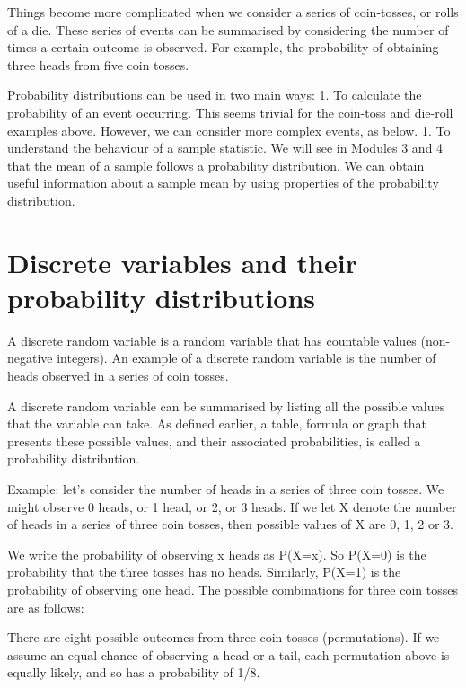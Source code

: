 \documentclass[
]{memoir}
\begin{document}
Things become more complicated when we consider a series of coin-tosses, or rolls of a die. These series of events can be summarised by considering the number of times a certain outcome is observed. For example, the probability of obtaining three heads from five coin tosses.

Probability distributions can be used in two main ways:
1. To calculate the probability of an event occurring. This seems trivial for the coin-toss and die-roll examples above. However, we can consider more complex events, as below.
1. To understand the behaviour of a sample statistic. We will see in Modules 3 and 4 that the mean of a sample follows a probability distribution. We can obtain useful information about a sample mean by using properties of the probability distribution.

\hypertarget{discrete-variables-and-their-probability-distributions}{%
\section{Discrete variables and their probability distributions}\label{discrete-variables-and-their-probability-distributions}}

A discrete random variable is a random variable that has countable values (non-negative integers). An example of a discrete random variable is the number of heads observed in a series of coin tosses.

A discrete random variable can be summarised by listing all the possible values that the variable can take. As defined earlier, a table, formula or graph that presents these possible values, and their associated probabilities, is called a probability distribution.

Example: let's consider the number of heads in a series of three coin tosses. We might observe 0 heads, or 1 head, or 2, or 3 heads. If we let X denote the number of heads in a series of three coin tosses, then possible values of X are 0, 1, 2 or 3.

We write the probability of observing x heads as P(X=x). So P(X=0) is the probability that the three tosses has no heads. Similarly, P(X=1) is the probability of observing one head.
The possible combinations for three coin tosses are as follows:

There are eight possible outcomes from three coin tosses (permutations). If we assume an equal chance of observing a head or a tail, each permutation above is equally likely, and so has a probability of 1/8.
\end{document}
